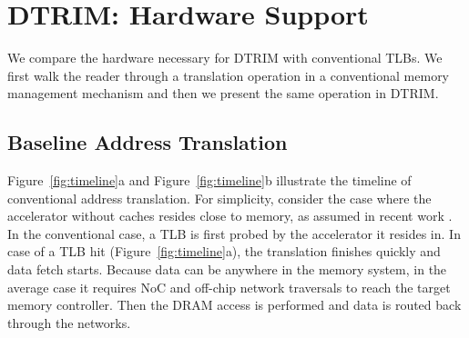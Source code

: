\section{DTRIM: Hardware Support}
\label{sec:hw_support}

%


We compare the hardware necessary for DTRIM with conventional
TLBs. We first walk the reader through a translation operation in a
conventional memory management mechanism and then we present the same
operation in DTRIM.

\subsection{Baseline Address Translation}

Figure~\ref{fig:timeline}a and Figure~\ref{fig:timeline}b illustrate the timeline of
conventional address translation. For simplicity, consider the case 
where the accelerator without caches resides close to memory, as
assumed in recent work \cite{haria:devirtualizing, picorel:near-memory}. In the conventional case, a TLB is
first probed by the accelerator it resides in. In case of a TLB hit (Figure~\ref{fig:timeline}a), the translation finishes quickly and 
data fetch starts. Because data can be anywhere in the memory system, in the average case it requires NoC and off-chip network 
traversals to reach the target memory controller. Then the DRAM access is performed and data is routed back through the networks.

